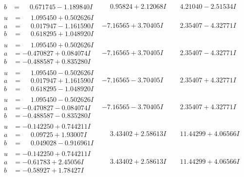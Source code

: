 \documentclass[1p]{elsarticle_modified}
\theoremstyle{definition}
\begin{document}
$$\begin{array}{c|c|c}
\begin{aligned}
b &= \phantom{-}0.671745 - 1.189840 I\end{aligned}
 & \phantom{-}0.95824 + 2.12068 I & \phantom{-}4.21040 - 2.51534 I \\ \hline\begin{aligned}
u &= \phantom{-}1.095450 + 0.502626 I \\
a &= \phantom{-}0.017947 - 1.161590 I \\
b &= \phantom{-}0.618295 + 1.048920 I\end{aligned}
 & -7.16565 + 3.70405 I & \phantom{-}2.35407 - 4.32771 I \\ \hline\begin{aligned}
u &= \phantom{-}1.095450 + 0.502626 I \\
a &= -0.470827 + 0.084074 I \\
b &= -0.488587 + 0.835280 I\end{aligned}
 & -7.16565 + 3.70405 I & \phantom{-}2.35407 - 4.32771 I \\ \hline\begin{aligned}
u &= \phantom{-}1.095450 - 0.502626 I \\
a &= \phantom{-}0.017947 + 1.161590 I \\
b &= \phantom{-}0.618295 - 1.048920 I\end{aligned}
 & -7.16565 - 3.70405 I & \phantom{-}2.35407 + 4.32771 I \\ \hline\begin{aligned}
u &= \phantom{-}1.095450 - 0.502626 I \\
a &= -0.470827 - 0.084074 I \\
b &= -0.488587 - 0.835280 I\end{aligned}
 & -7.16565 - 3.70405 I & \phantom{-}2.35407 + 4.32771 I \\ \hline\begin{aligned}
u &= -0.142250 + 0.744211 I \\
a &= \phantom{-}0.09725 + 1.93007 I \\
b &= \phantom{-}0.049028 - 0.916961 I\end{aligned}
 & \phantom{-}3.43402 + 2.58613 I & \phantom{-}11.44299 + 4.06566 I \\ \hline\begin{aligned}
u &= -0.142250 + 0.744211 I \\
a &= -0.61783 + 2.45056 I \\
b &= -0.58927 + 1.78427 I\end{aligned}
 & \phantom{-}3.43402 + 2.58613 I & \phantom{-}11.44299 + 4.06566 I \\ \hline\begin{aligned}

\end{aligned}
\end{array}$$
\end{document}
